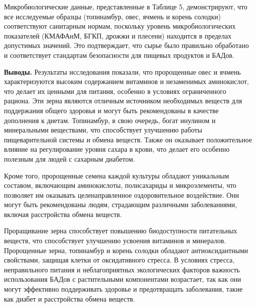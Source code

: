 
Микробиологические данные, представленные в Таблице 5, демонстрируют,
что все исследуемые образцы (топинамбур, овес, ячмень и корень солодки)
соответствуют санитарным нормам, поскольку уровень микробиологических
показателей (КМАФАнМ, БГКП, дрожжи и плесени) находится в пределах
допустимых значений. Это подтверждает, что сырье было правильно
обработано и соответствует стандартам безопасности для пищевых продуктов
и БАДов.

{\bfseries Выводы.} Результаты исследования показали, что пророщенные овес
и ячмень характеризуются высоким содержанием витаминов и незаменимых
аминокислот, что делает их ценными для питания, особенно в условиях
ограниченного рациона. Эти зерна являются отличным источником
необходимых веществ для поддержания общего здоровья и могут быть
рекомендованы в качестве дополнения к диетам. Топинамбур, в свою
очередь, богат инулином и минеральными веществами, что способствует
улучшению работы пищеварительной системы и обмена веществ. Также он
оказывает положительное влияние на регулирование уровня сахара в крови,
что делает его особенно полезным для людей с сахарным диабетом.

Кроме того, пророщенные семена каждой культуры обладают уникальным
составом, включающим аминокислоты, полисахариды и микроэлементы, что
позволяет им оказывать целенаправленное оздоровительное воздействие. Они
могут быть рекомендованы людям, страдающим различными заболеваниями,
включая расстройства обмена веществ.

Проращивание зерна способствует повышению биодоступности питательных
веществ, что способствует улучшению усвоения витаминов и минералов.
Пророщенные зерна, топинамбур и корень солодки обладают антиоксидантными
свойствами, защищая клетки от оксидативного стресса. В условиях стресса,
неправильного питания и неблагоприятных экологических факторов важность
использования БАДов с растительными компонентами возрастает, так как они
могут эффективно поддерживать здоровье и предотвращать заболевания,
такие как диабет и расстройства обмена веществ.

